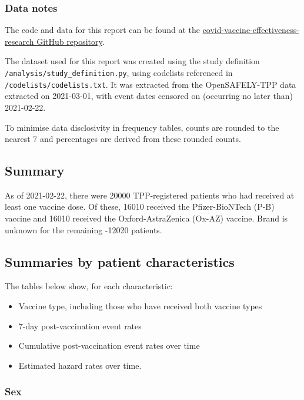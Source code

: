 \documentclass[
]{article}
\providecommand{\tightlist}{%
  \setlength{\itemsep}{0pt}\setlength{\parskip}{0pt}}
\begin{document}
\hypertarget{data-notes}{%
\subsubsection{Data notes}\label{data-notes}}

The code and data for this report can be found at the
\href{https://github.com/opensafely/covid-vaccine-effectiveness-research}{covid-vaccine-effectiveness-research
GitHub repository}.

The dataset used for this report was created using the study definition
\texttt{/analysis/study\_definition.py}, using codelists referenced in
\texttt{/codelists/codelists.txt}. It was extracted from the
OpenSAFELY-TPP data extracted on 2021-03-01, with event dates censored
on (occurring no later than) 2021-02-22.

To minimise data disclosivity in frequency tables, counts are rounded to
the nearest 7 and percentages are derived from these rounded counts.

\hypertarget{summary}{%
\subsection{Summary}\label{summary}}

As of 2021-02-22, there were 20000 TPP-registered patients who had
received at least one vaccine dose. Of these, 16010 received the
Pfizer-BioNTech (P-B) vaccine and 16010 received the Oxford-AstraZenica
(Ox-AZ) vaccine. Brand is unknown for the remaining -12020 patients.

\hypertarget{summaries-by-patient-characteristics}{%
\subsection{Summaries by patient
characteristics}\label{summaries-by-patient-characteristics}}

The tables below show, for each characteristic:

\begin{itemize}
\tightlist
\item
  Vaccine type, including those who have received both vaccine types
\item
  7-day post-vaccination event rates
\item
  Cumulative post-vaccination event rates over time
\item
  Estimated hazard rates over time.
\end{itemize}

\hypertarget{sex}{%
\subsubsection{Sex}\label{sex}}
\end{document}
